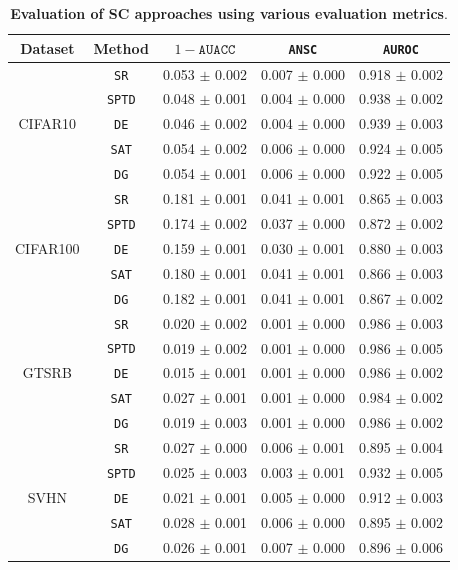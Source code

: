 \begin{table}[ht]
\centering
\caption{\textbf{Evaluation of SC approaches using various evaluation metrics}. }
\label{tab:sc_evals}
\begin{tabular}{ccccc}
\toprule
Dataset & Method & $1-\texttt{AUACC}$ & \texttt{ANSC} & \texttt{AUROC} \\
\midrule
\multirow{5}{*}{CIFAR10} & \texttt{SR} & 0.053 $\pm$ 0.002 & 0.007 $\pm$ 0.000 & 0.918 $\pm$ 0.002 \\
& \texttt{SPTD} & 0.048 $\pm$ 0.001 & 0.004 $\pm$ 0.000 & 0.938 $\pm$ 0.002 \\
& \texttt{DE} & 0.046 $\pm$ 0.002 & 0.004 $\pm$ 0.000 & 0.939 $\pm$ 0.003 \\
& \texttt{SAT} & 0.054 $\pm$ 0.002 & 0.006 $\pm$ 0.000 & 0.924 $\pm$ 0.005 \\
& \texttt{DG} & 0.054 $\pm$ 0.001 & 0.006 $\pm$ 0.000 & 0.922 $\pm$ 0.005 \\
\midrule
\multirow{5}{*}{CIFAR100} & \texttt{SR} & 0.181 $\pm$ 0.001 & 0.041 $\pm$ 0.001 & 0.865 $\pm$ 0.003 \\
& \texttt{SPTD} & 0.174 $\pm$ 0.002 & 0.037 $\pm$ 0.000 & 0.872 $\pm$ 0.002 \\
& \texttt{DE} & 0.159 $\pm$ 0.001 & 0.030 $\pm$ 0.001 & 0.880 $\pm$ 0.003 \\
& \texttt{SAT} & 0.180 $\pm$ 0.001 & 0.041 $\pm$ 0.001 & 0.866 $\pm$ 0.003 \\
& \texttt{DG} & 0.182 $\pm$ 0.001 & 0.041 $\pm$ 0.001 & 0.867 $\pm$ 0.002 \\
\midrule
\multirow{5}{*}{GTSRB} & \texttt{SR} & 0.020 $\pm$ 0.002 & 0.001 $\pm$ 0.000 & 0.986 $\pm$ 0.003 \\
& \texttt{SPTD} & 0.019 $\pm$ 0.002 & 0.001 $\pm$ 0.000 & 0.986 $\pm$ 0.005 \\
& \texttt{DE} & 0.015 $\pm$ 0.001 & 0.001 $\pm$ 0.000 & 0.986 $\pm$ 0.002 \\
& \texttt{SAT} & 0.027 $\pm$ 0.001 & 0.001 $\pm$ 0.000 & 0.984 $\pm$ 0.002 \\
& \texttt{DG} & 0.019 $\pm$ 0.003 & 0.001 $\pm$ 0.000 & 0.986 $\pm$ 0.002 \\
\midrule
\multirow{5}{*}{SVHN} & \texttt{SR} & 0.027 $\pm$ 0.000 & 0.006 $\pm$ 0.001 & 0.895 $\pm$ 0.004 \\
& \texttt{SPTD} & 0.025 $\pm$ 0.003 & 0.003 $\pm$ 0.001 & 0.932 $\pm$ 0.005 \\
& \texttt{DE} & 0.021 $\pm$ 0.001 & 0.005 $\pm$ 0.000 & 0.912 $\pm$ 0.003 \\
& \texttt{SAT} & 0.028 $\pm$ 0.001 & 0.006 $\pm$ 0.000 & 0.895 $\pm$ 0.002 \\
& \texttt{DG} & 0.026 $\pm$ 0.001 & 0.007 $\pm$ 0.000 & 0.896 $\pm$ 0.006 \\
\bottomrule
\end{tabular}
\end{table}

